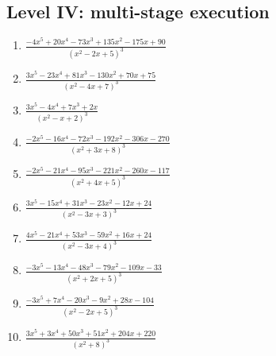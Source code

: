 \documentclass[11pt,oneside]{book}
\begin{document}
\subsection*{Level IV: multi-stage execution}
\begin{enumerate}[leftmargin=*,label=\textbf{\arabic*.},itemsep=0.65\baselineskip]
\item $\displaystyle \frac{- 4 x^{5} + 20 x^{4} - 73 x^{3} + 135 x^{2} - 175 x + 90}{\left(x^{2} - 2 x + 5\right)^{3}}$
\item $\displaystyle \frac{3 x^{5} - 23 x^{4} + 81 x^{3} - 130 x^{2} + 70 x + 75}{\left(x^{2} - 4 x + 7\right)^{3}}$
\item $\displaystyle \frac{3 x^{5} - 4 x^{4} + 7 x^{3} + 2 x}{\left(x^{2} - x + 2\right)^{3}}$
\item $\displaystyle \frac{- 2 x^{5} - 16 x^{4} - 72 x^{3} - 192 x^{2} - 306 x - 270}{\left(x^{2} + 3 x + 8\right)^{3}}$
\item $\displaystyle \frac{- 2 x^{5} - 21 x^{4} - 95 x^{3} - 221 x^{2} - 260 x - 117}{\left(x^{2} + 4 x + 5\right)^{3}}$
\item $\displaystyle \frac{3 x^{5} - 15 x^{4} + 31 x^{3} - 23 x^{2} - 12 x + 24}{\left(x^{2} - 3 x + 3\right)^{3}}$
\item $\displaystyle \frac{4 x^{5} - 21 x^{4} + 53 x^{3} - 59 x^{2} + 16 x + 24}{\left(x^{2} - 3 x + 4\right)^{3}}$
\item $\displaystyle \frac{- 3 x^{5} - 13 x^{4} - 48 x^{3} - 79 x^{2} - 109 x - 33}{\left(x^{2} + 2 x + 5\right)^{3}}$
\item $\displaystyle \frac{- 3 x^{5} + 7 x^{4} - 20 x^{3} - 9 x^{2} + 28 x - 104}{\left(x^{2} - 2 x + 5\right)^{3}}$
\item $\displaystyle \frac{3 x^{5} + 3 x^{4} + 50 x^{3} + 51 x^{2} + 204 x + 220}{\left(x^{2} + 8\right)^{3}}$
\end{enumerate}
\end{document}
